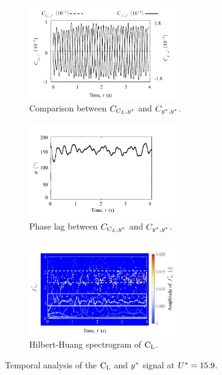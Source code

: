 \documentclass[oneside]{utmthesis}
\begin{document}
\begin{figure}[H]
  \centering
  \begin{subfigure}[h]{1\textwidth}
    \hspace{2.4cm}
    \includegraphics[width=0.7\textwidth]{figs/tempAnalysisTransition-a}
    \caption{Comparison between $C_{\text{C}_{L},y^{*}}$ and $C_{y^{*},y^{*}}$.}
    \label{fig:tempAnalysisTransition-a}
  \end{subfigure}

  \begin{subfigure}[h]{1\textwidth}
    \hspace{2.4cm}
    \includegraphics[width=0.7\textwidth]{figs/tempAnalysisTransition-b}
    \caption{Phase lag between $C_{\text{C}_{L},y^{*}}$ and $C_{y^{*},y^{*}}$.}
    \label{fig:tempAnalysisTransition-b}
  \end{subfigure}

  \begin{subfigure}[h]{1\textwidth}
    \hspace{2.4cm}
    \includegraphics[width=0.7\textwidth]{figs/tempAnalysisTransition-c}
    \caption{Hilbert-Huang spectrogram of $\text{C}_{\text{L}}$.}
    \label{fig:tempAnalysisTransition-c}
  \end{subfigure}
  \caption{Temporal analysis of the $\text{C}_{\text{L}}$ and $y^{*}$ signal at $U^{*} = 15.9$.}
  \label{fig:tempAnalysisTransition}
\end{figure}
\end{document}
